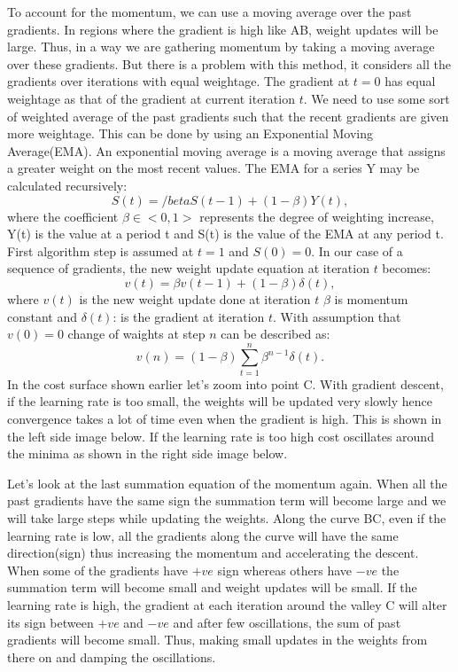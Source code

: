 To account for the momentum, we can use a moving average over the past gradients.
In regions where the gradient is high like AB, weight updates will be large. Thus, in a way we
are gathering momentum by taking a moving average over these gradients.
But there is a problem with this method, it considers all the gradients over iterations with 
equal weightage. The gradient at $t=0$ has equal weightage as that of the gradient at
current iteration $t$. We need to use some sort of weighted average of the past gradients such
that the recent gradients are given more weightage.
This can be done by using an Exponential Moving Average(EMA).
An exponential moving average is a moving average that assigns a greater weight on the most 
recent values. The EMA for a series Y may be calculated recursively:
\begin{equation}
	\label{equ:ema}
	S(t) = /beta S(t-1)+(1-\beta)Y(t),
\end{equation}
where the coefficient $\beta \in <0,1>$ represents the degree of weighting increase,  Y(t) is
the value at a period t and  S(t) is the value of the EMA at any period t.
First algorithm step is assumed at $t=1$ and $S(0)=0$.
In our case of a sequence of gradients, the new weight update equation at iteration $t$ becomes:
\begin{equation}
	\label{equ:momentum_update}
	v(t) = \beta v(t-1)+(1-\beta)\delta(t),
\end{equation}
where $v(t)$ is the new weight update done at iteration $t$ $\beta$ is momentum constant and
$\delta(t)$: is the gradient at iteration $t$.
With assumption that $v(0)=0$ change of waights at step $n$ can be described as:
\begin{equation}
	\label{equ:momentum_update_sum}
	v(n) = (1-\beta)\sum_{t=1}^{n}\beta^{n-1}\delta(t).
\end{equation}
In the cost surface shown earlier let's zoom into point C.
With gradient descent, if the learning rate is too small, the weights will be updated very 
slowly hence convergence takes a lot of time even when the gradient is high. 
This is shown in the left side image below. If the learning rate is too high cost
oscillates around the minima as shown in the right side image below.

Let's look at the last summation equation of the momentum again.
When all the past gradients have the same sign the summation term will become large and we 
will take large steps while updating the weights.
Along the curve BC, even if the learning rate is low, all the gradients along the curve will 
have the same direction(sign) thus increasing the momentum and accelerating the descent.
When some of the gradients have $+ve$ sign whereas others have $-ve$ the summation term will
become small and weight updates will be small. 
If the learning rate is high, the gradient at each iteration around the valley C will
alter its sign between $+ve$ and $-ve$ and after few oscillations, the sum of past gradients 
will become small. Thus, making small updates in the weights from there on and damping the 
oscillations.


